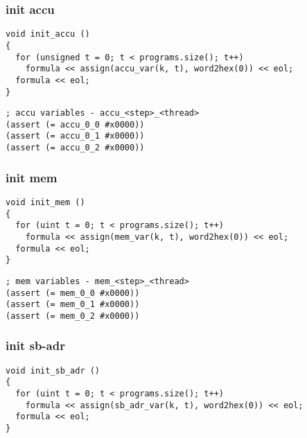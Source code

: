 \begin{lstlisting}[language=SMTLib]
\end{lstlisting}

\subsubsection{init accu}

\begin{lstlisting}[style=c++]
void init_accu ()
{
  for (unsigned t = 0; t < programs.size(); t++)
    formula << assign(accu_var(k, t), word2hex(0)) << eol;
  formula << eol;
}
\end{lstlisting}

\begin{lstlisting}[language=SMTLib]
; accu variables - accu_<step>_<thread>
(assert (= accu_0_0 #x0000))
(assert (= accu_0_1 #x0000))
(assert (= accu_0_2 #x0000))
\end{lstlisting}

\subsubsection{init mem}

\begin{lstlisting}[style=c++]
void init_mem ()
{
  for (uint t = 0; t < programs.size(); t++)
    formula << assign(mem_var(k, t), word2hex(0)) << eol;
  formula << eol;
}
\end{lstlisting}

\begin{lstlisting}[language=SMTLib]
; mem variables - mem_<step>_<thread>
(assert (= mem_0_0 #x0000))
(assert (= mem_0_1 #x0000))
(assert (= mem_0_2 #x0000))
\end{lstlisting}

\subsubsection{init sb-adr}

\begin{lstlisting}[style=c++]
void init_sb_adr ()
{
  for (uint t = 0; t < programs.size(); t++)
    formula << assign(sb_adr_var(k, t), word2hex(0)) << eol;
  formula << eol;
}
\end{lstlisting}

